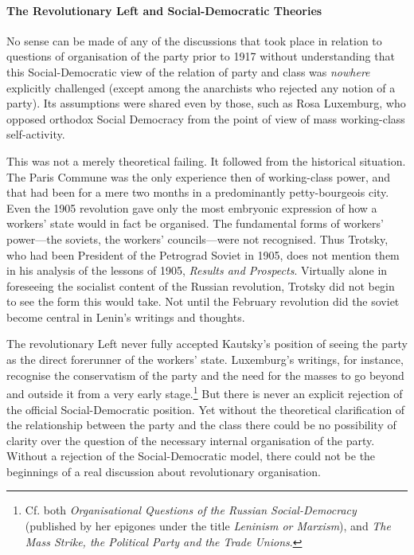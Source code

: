 \paragraph{The Revolutionary Left and Social-Democratic Theories}

No sense can be made of any of the discussions that took place in relation to questions of organisation of the party prior to 1917 without understanding that this Social-Democratic view of the relation of party and class was \emph{nowhere} explicitly challenged (except among the anarchists who rejected any notion of a party). Its assumptions were shared even by those, such as Rosa Luxemburg, who opposed orthodox Social Democracy from the point of view of mass working-class self-activity.

This was not a merely theoretical failing. It followed from the historical situation. The Paris Commune was the only experience then of working-class power, and that had been for a mere two months in a predominantly petty-bourgeois city. Even the 1905 revolution gave only the most embryonic expression of how a workers' state would in fact be organised. The fundamental forms of workers' power---the soviets, the workers' councils---were not recognised. Thus Trotsky, who had been President of the Petrograd Soviet in 1905, does not mention them in his analysis of the lessons of 1905, \emph{Results and Prospects}. Virtually alone in foreseeing the socialist content of the Russian revolution, Trotsky did not begin to see the form this would take. Not until the February revolution did the soviet become central in Lenin's writings and thoughts.

The revolutionary Left never fully accepted Kautsky's position of seeing the party as the direct forerunner of the workers' state. Luxemburg's writings, for instance, recognise the conservatism of the party and the need for the masses to go beyond and outside it from a very early stage.\footnote{Cf. both \emph{Organisational Questions of the Russian Social-Democracy} (published by her epigones under the title \emph{Leninism or Marxism}), and \emph{The Mass Strike, the Political Party and the Trade Unions}.} But there is never an explicit rejection of the official Social-Democratic position. Yet without the theoretical clarification of the relationship between the party and the class there could be no possibility of clarity over the question of the necessary internal organisation of the party. Without a rejection of the Social-Democratic model, there could not be the beginnings of a real discussion about revolutionary organisation.

